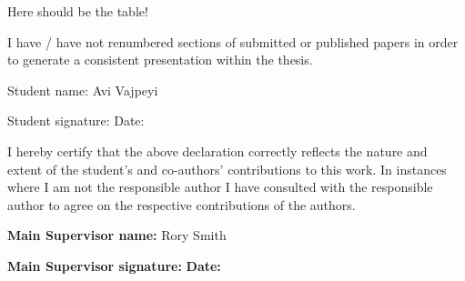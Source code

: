 {Here should be the table!

I have / have not renumbered sections of submitted or published papers
in order to generate a consistent presentation within the thesis.

Student name: Avi Vajpeyi

Student signature: Date:

I hereby certify that the above declaration correctly reflects the
nature and extent of the student's and co-authors' contributions to this
work. In instances where I am not the responsible author I have
consulted with the responsible author to agree on the respective
contributions of the authors.

\textbf{Main Supervisor name:} Rory Smith

\textbf{Main Supervisor signature:} \textbf{Date:}


}
